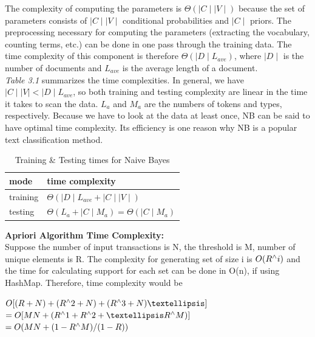 The complexity of computing the parameters is  
$\Theta(\mid C \mid \mid V\mid)$ because the set of parameters consists of $\mid C \mid \mid V\mid$ conditional probabilities and $\mid C \mid$ priors. The preprocessing necessary for computing the parameters (extracting the vocabulary, counting terms, etc.) can be done in one pass through the training data. The time complexity of this component is therefore $\Theta(\mid D \mid L_{ave})$, where $\mid D \mid$ is the number of documents and $ L_{ave}$ is the average length of a document.\\


\textit{Table 3.1} summarizes the time complexities. In general, we have\\
 $\mid C \mid \mid V\mid < \mid D \mid L_{ave}$, so both training and testing complexity are linear in the time it takes to scan the data.  $ L_{a}$ and $ M_{a}$ are the numbers of tokens and types, respectively. Because we have to look at the data at least once, NB can be said to have optimal time complexity. Its efficiency is one reason why NB is a popular text classification method.\\

\begin{table}[ht]
\caption{Training \& Testing times for Naive Bayes}
\centering
\begin{tabular}{ |M{4cm}|p{7cm}|  }
 \hline
 mode & time complexity \\
 \hline
 training & $\Theta(\mid D \mid L_{ave} + \mid C \mid \mid V \mid)$\\
 \hline 
 testing & $\Theta(L_{a} + \mid C \mid M_a)=\Theta(\mid C \mid M_a)$\\
 \hline
 
 \end{tabular}

\end{table}
\vspace*{1cm}
\noindent
\textbf{Apriori Algorithm Time Complexity:}\\

Suppose the number of input transactions is N, the threshold is M, number of unique elements is R. The complexity for generating set of size i is $O(R\textsuperscript{$\wedge$}i)$ and the time for calculating support for each set can be done in O(n), if using HashMap. Therefore,  time complexity would be\\
\begin{center}
$O[(R + N) + (R\textsuperscript{$\wedge$}2 + N)  + (R\textsuperscript{$\wedge$}3 + N)  …] $\\
$= O[MN + (R\textsuperscript{$\wedge$}1+R\textsuperscript{$\wedge$}2+ … R\textsuperscript{$\wedge$}M)] $\\
$= O(MN+ (1-R\textsuperscript{$\wedge$}M)/(1-R))$
\end{center}




